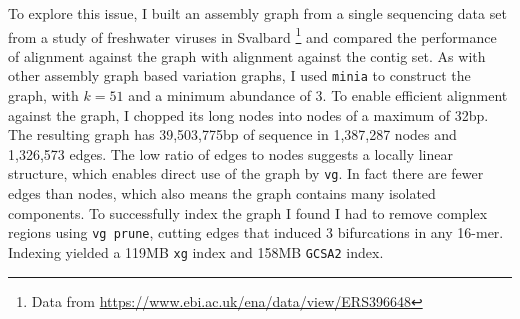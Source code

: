\documentclass[a4paper,12pt,numbered,oneside]{Classes/PhDThesisPSnPDF}
\begin{document}
To explore this issue, I built an assembly graph from a single sequencing data set from a study of freshwater viruses in Svalbard \cite{de2015biodiversity}\footnote{Data from \url{https://www.ebi.ac.uk/ena/data/view/ERS396648}} and compared the performance of alignment against the graph with alignment against the contig set.
As with other assembly graph based variation graphs, I used {\tt minia} to construct the graph, with $k=51$ and a minimum abundance of 3.
To enable efficient alignment against the graph, I chopped its long nodes into nodes of a maximum of 32bp.
The resulting graph has 39,503,775bp of sequence in 1,387,287 nodes and 1,326,573 edges.
The low ratio of edges to nodes suggests a locally linear structure, which enables direct use of the graph by {\tt vg}.
In fact there are fewer edges than nodes, which also means the graph contains many isolated components.
To successfully index the graph I found I had to remove complex regions using {\tt vg prune}, cutting edges that induced 3 bifurcations in any 16-mer.
Indexing yielded a 119MB {\tt xg} index and 158MB {\tt GCSA2} index.
\end{document}
